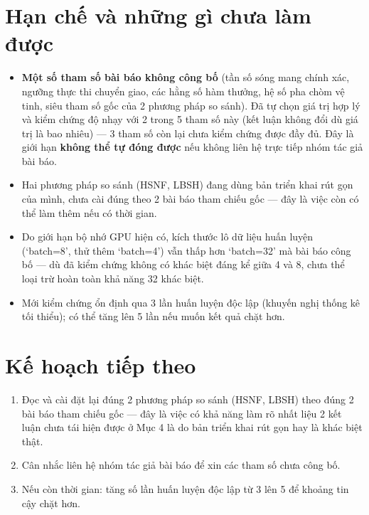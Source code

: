 \documentclass[12pt,a4paper]{article}
\begin{document}
\section{Hạn chế và những gì chưa làm được}

\begin{itemize}[leftmargin=1.2em]
  \item \textbf{Một số tham số bài báo không công bố} (tần số sóng mang chính xác, ngưỡng
        thực thi chuyển giao, các hằng số hàm thưởng, hệ số pha chòm vệ tinh, siêu tham số
        gốc của 2 phương pháp so sánh). Đã tự chọn giá trị hợp lý và kiểm chứng độ nhạy với
        2 trong 5 tham số này (kết luận không đổi dù giá trị là bao nhiêu) — 3 tham số còn lại
        chưa kiểm chứng được đầy đủ. Đây là giới hạn \textbf{không thể tự đóng được} nếu không
        liên hệ trực tiếp nhóm tác giả bài báo.
  \item Hai phương pháp so sánh (HSNF, LBSH) đang dùng bản triển khai rút gọn của mình, chưa
        cài đúng theo 2 bài báo tham chiếu gốc — đây là việc còn có thể làm thêm nếu có thời
        gian.
  \item Do giới hạn bộ nhớ GPU hiện có, kích thước lô dữ liệu huấn luyện (`batch=8', thử thêm
        `batch=4') vẫn thấp hơn `batch=32' mà bài báo công bố — dù đã kiểm chứng không có
        khác biệt đáng kể giữa 4 và 8, chưa thể loại trừ hoàn toàn khả năng 32 khác biệt.
  \item Mới kiểm chứng ổn định qua 3 lần huấn luyện độc lập (khuyến nghị thống kê tối thiểu);
        có thể tăng lên 5 lần nếu muốn kết quả chặt hơn.
\end{itemize}

\section{Kế hoạch tiếp theo}

\begin{enumerate}[leftmargin=1.2em]
  \item Đọc và cài đặt lại đúng 2 phương pháp so sánh (HSNF, LBSH) theo đúng 2 bài báo tham
        chiếu gốc — đây là việc có khả năng làm rõ nhất liệu 2 kết luận chưa tái hiện được ở
        Mục 4 là do bản triển khai rút gọn hay là khác biệt thật.
  \item Cân nhắc liên hệ nhóm tác giả bài báo để xin các tham số chưa công bố.
  \item Nếu còn thời gian: tăng số lần huấn luyện độc lập từ 3 lên 5 để khoảng tin cậy chặt
        hơn.
\end{enumerate}
\end{document}
